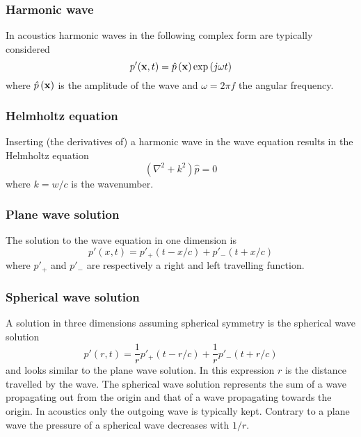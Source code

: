\subsubsection*{Harmonic wave}
In acoustics harmonic waves in the following complex form are typically considered
\begin{equation}
  p' (\mathbf{x}, t) = \hat{p} \left(\mathbf{x}\right) \exp{\left(j \omega t \right)}
\end{equation}
where $\hat{p} \left(\mathbf{x}\right)$ is the amplitude of the wave and $\omega=2 \pi f$ the angular frequency.

\subsubsection*{Helmholtz equation}
Inserting (the derivatives of) a harmonic wave in the wave equation results in
the Helmholtz equation
\begin{equation}\label{eq:theory:sound:wave:helmholtz}
 \left( \nabla^2 + k^2 \right) \hat{p} = 0
\end{equation}
where $k=w/c$ is the wavenumber.

\subsubsection*{Plane wave solution}
The solution to the wave equation in one dimension is
\begin{equation}
  p'(x,t) = p'_{+} (t-x/c) + p'_{-} (t+x/c)
\end{equation}
where $p'_{+}$ and $p'_{-}$ are respectively a right and left travelling function.

\subsubsection*{Spherical wave solution}
A solution in three dimensions assuming spherical symmetry is the spherical wave solution
\begin{equation}
  p'(r,t) = \frac{1}{r} p'_{+} (t-r/c) + \frac{1}{r} p'_{-} (t+r/c)
\end{equation}
and looks similar to the plane wave solution. In this expression $r$ is the
distance travelled by the wave. The spherical wave solution represents the sum
of a wave propagating out from the origin and that of a wave propagating towards
the origin. In acoustics only the outgoing wave is typically kept. Contrary to
a plane wave the pressure of a spherical wave decreases with $1/r$.

